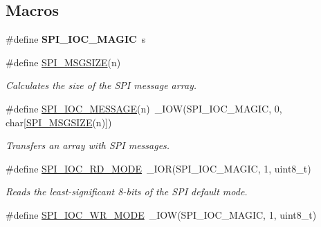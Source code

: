 \subsection*{Macros}
\begin{DoxyCompactItemize}
\item 
\mbox{\label{group__SPILinux_ga7d347a20662b2baa1ac6dd66a923afe6}} 
\#define {\bfseries S\+P\+I\+\_\+\+I\+O\+C\+\_\+\+M\+A\+G\+IC}~\textquotesingle{}s\textquotesingle{}
\item 
\#define \mbox{\hyperlink{group__SPILinux_ga589246eb1d667f369392c3bfa53143c4}{S\+P\+I\+\_\+\+M\+S\+G\+S\+I\+ZE}}(n)
\begin{DoxyCompactList}\small\item\em Calculates the size of the S\+PI message array. \end{DoxyCompactList}\item 
\mbox{\label{group__SPILinux_ga7b48d1195ba00bd9abc6d7c36ebb6357}} 
\#define \mbox{\hyperlink{group__SPILinux_ga7b48d1195ba00bd9abc6d7c36ebb6357}{S\+P\+I\+\_\+\+I\+O\+C\+\_\+\+M\+E\+S\+S\+A\+GE}}(n)~\+\_\+\+I\+OW(S\+P\+I\+\_\+\+I\+O\+C\+\_\+\+M\+A\+G\+IC, 0, char\mbox{[}\mbox{\hyperlink{group__SPILinux_ga589246eb1d667f369392c3bfa53143c4}{S\+P\+I\+\_\+\+M\+S\+G\+S\+I\+ZE}}(n)\mbox{]})
\begin{DoxyCompactList}\small\item\em Transfers an array with S\+PI messages. \end{DoxyCompactList}\item 
\mbox{\label{group__SPILinux_gaa0e87d995d3080f915bb87d8a43b9be9}} 
\#define \mbox{\hyperlink{group__SPILinux_gaa0e87d995d3080f915bb87d8a43b9be9}{S\+P\+I\+\_\+\+I\+O\+C\+\_\+\+R\+D\+\_\+\+M\+O\+DE}}~\+\_\+\+I\+OR(S\+P\+I\+\_\+\+I\+O\+C\+\_\+\+M\+A\+G\+IC, 1, uint8\+\_\+t)
\begin{DoxyCompactList}\small\item\em Reads the least-\/significant 8-\/bits of the S\+PI default mode. \end{DoxyCompactList}\item 
\mbox{\label{group__SPILinux_gad4c4247804e335fc75141ac48bbc88f9}} 
\#define \mbox{\hyperlink{group__SPILinux_gad4c4247804e335fc75141ac48bbc88f9}{S\+P\+I\+\_\+\+I\+O\+C\+\_\+\+W\+R\+\_\+\+M\+O\+DE}}~\+\_\+\+I\+OW(S\+P\+I\+\_\+\+I\+O\+C\+\_\+\+M\+A\+G\+IC, 1, uint8\+\_\+t)

\end{DoxyCompactItemize}
